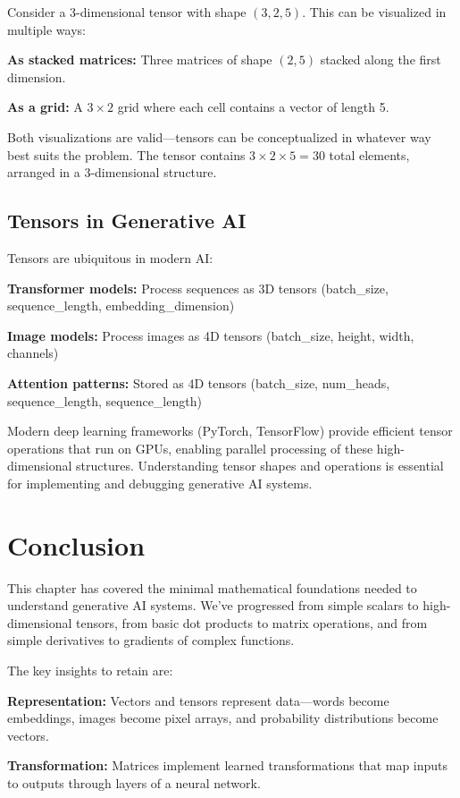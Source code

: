 \documentclass{book}
\begin{document}
Consider a 3-dimensional tensor with shape $(3, 2, 5)$. This can be visualized in multiple ways:

\textbf{As stacked matrices:} Three matrices of shape $(2, 5)$ stacked along the first dimension.

\textbf{As a grid:} A $3 \times 2$ grid where each cell contains a vector of length 5.

Both visualizations are valid—tensors can be conceptualized in whatever way best suits the problem. The tensor contains $3 \times 2 \times 5 = 30$ total elements, arranged in a 3-dimensional structure.

\subsection{Tensors in Generative AI}

Tensors are ubiquitous in modern AI:

\textbf{Transformer models:} Process sequences as 3D tensors (batch\_size, sequence\_length, embedding\_dimension)

\textbf{Image models:} Process images as 4D tensors (batch\_size, height, width, channels)

\textbf{Attention patterns:} Stored as 4D tensors (batch\_size, num\_heads, sequence\_length, sequence\_length)

Modern deep learning frameworks (PyTorch, TensorFlow) provide efficient tensor operations that run on GPUs, enabling parallel processing of these high-dimensional structures. Understanding tensor shapes and operations is essential for implementing and debugging generative AI systems.

\section{Conclusion}

This chapter has covered the minimal mathematical foundations needed to understand generative AI systems. We've progressed from simple scalars to high-dimensional tensors, from basic dot products to matrix operations, and from simple derivatives to gradients of complex functions.

The key insights to retain are:

\textbf{Representation:} Vectors and tensors represent data—words become embeddings, images become pixel arrays, and probability distributions become vectors.

\textbf{Transformation:} Matrices implement learned transformations that map inputs to outputs through layers of a neural network.
\end{document}
